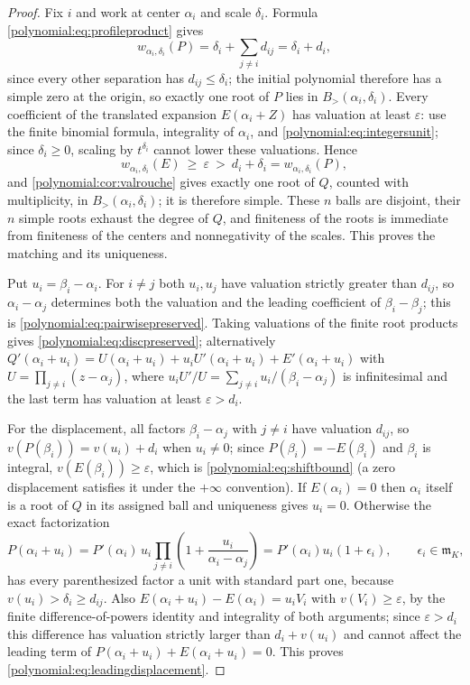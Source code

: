 \documentclass[11pt,letterpaper]{article}
\numberwithin{equation}{section}
\theoremstyle{definition}
\theoremstyle{remark}\newtheorem{remark}[theorem]{Remark}
\newcommand{\mm}{\mathfrak m}
\newcommand{\Bgt}[2]{B_{>}(#1,#2)}
\begin{document}
\begin{proof}
Fix $i$ and work at center $\alpha_i$ and scale $\delta_i$. Formula
\eqref{polynomial:eq:profileproduct} gives
\begin{equation}\label{polynomial:eq:rootweight}
 w_{\alpha_i,\delta_i}(P)=\delta_i+\sum_{j\ne i}d_{ij}=\delta_i+d_i,
\end{equation}
since every other separation has $d_{ij}\le\delta_i$; the initial polynomial
therefore has a simple zero at the origin, so exactly one root of $P$ lies in
$\Bgt{\alpha_i}{\delta_i}$. Every coefficient of the translated expansion
$E(\alpha_i+Z)$ has valuation at least $\varepsilon$: use the finite binomial
formula, integrality of $\alpha_i$, and
\eqref{polynomial:eq:integersunit}; since $\delta_i\ge0$, scaling by
$t^{\delta_i}$ cannot lower these valuations. Hence
\[
 w_{\alpha_i,\delta_i}(E)\ \ge\ \varepsilon\ >\ d_i+\delta_i
 =w_{\alpha_i,\delta_i}(P),
\]
and \cref{polynomial:cor:valrouche} gives exactly one root of $Q$, counted
with multiplicity, in $\Bgt{\alpha_i}{\delta_i}$; it is therefore simple.
These $n$ balls are disjoint, their $n$ simple roots exhaust the degree of
$Q$, and finiteness of the roots is immediate from finiteness of the centers
and nonnegativity of the scales. This proves the matching and its uniqueness.

Put $u_i=\beta_i-\alpha_i$. For $i\ne j$ both $u_i,u_j$ have valuation
strictly greater than $d_{ij}$, so $\alpha_i-\alpha_j$ determines both the
valuation and the leading coefficient of $\beta_i-\beta_j$; this is
\eqref{polynomial:eq:pairwisepreserved}. Taking valuations of the finite root
products gives \eqref{polynomial:eq:discpreserved}; alternatively
$Q'(\alpha_i+u_i)=U(\alpha_i+u_i)+u_iU'(\alpha_i+u_i)+E'(\alpha_i+u_i)$ with
$U=\prod_{j\ne i}(z-\alpha_j)$, where $u_iU'/U=\sum_{j\ne i}u_i/(\beta_i-\alpha_j)$
is infinitesimal and the last term has valuation at least
$\varepsilon>d_i$.

For the displacement, all factors $\beta_i-\alpha_j$ with $j\ne i$ have
valuation $d_{ij}$, so $v(P(\beta_i))=v(u_i)+d_i$ when $u_i\ne0$; since
$P(\beta_i)=-E(\beta_i)$ and $\beta_i$ is integral, $v(E(\beta_i))\ge\varepsilon$,
which is \eqref{polynomial:eq:shiftbound} (a zero displacement satisfies it
under the $+\infty$ convention). If $E(\alpha_i)=0$ then $\alpha_i$ itself is a
root of $Q$ in its assigned ball and uniqueness gives $u_i=0$. Otherwise the
exact factorization
\begin{equation}\label{polynomial:eq:productnearroot}
 P(\alpha_i+u_i)=P'(\alpha_i)\,u_i\prod_{j\ne i}
 \left(1+\frac{u_i}{\alpha_i-\alpha_j}\right)
 =P'(\alpha_i)u_i(1+\epsilon_i),\qquad \epsilon_i\in\mm_K,
\end{equation}
has every parenthesized factor a unit with standard part one, because
$v(u_i)>\delta_i\ge d_{ij}$. Also $E(\alpha_i+u_i)-E(\alpha_i)=u_iV_i$ with
$v(V_i)\ge\varepsilon$, by the finite difference-of-powers identity and
integrality of both arguments; since $\varepsilon>d_i$ this difference has
valuation strictly larger than $d_i+v(u_i)$ and cannot affect the leading term
of $P(\alpha_i+u_i)+E(\alpha_i+u_i)=0$. This proves
\eqref{polynomial:eq:leadingdisplacement}.


\end{proof}
\end{document}
